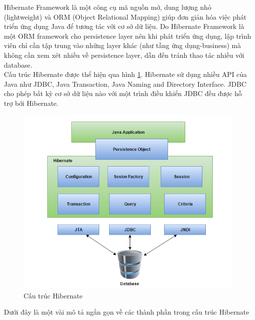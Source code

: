 \documentclass[12pt,a4paper,oneside]{extbook}
\begin{document}
Hibernate Framework là một công cụ mã nguồn mở, dung lượng nhỏ (lightweight) và ORM (Object Relational Mapping) giúp đơn giản hóa việc phát triển ứng dụng Java để tương tác với cơ sở dữ liệu. Do Hibernate Framework là một ORM framework cho persistence layer nên khi phát triển ứng dụng, lập trình viên chỉ cần tập trung vào những layer khác (như tầng ứng dụng-business) mà không cần xem xét nhiều về persistence layer, dẫn đến tránh thao tác nhiều với database.\\

\noindent
Cấu trúc Hibernate được thể hiện qua hình \ref{fig:3-hibernate-architecture}. Hibernate sử dụng nhiều API của Java như JDBC, Java Transaction, Java Naming and Directory Interface. JDBC cho  phép bất kỳ cơ sở dữ liệu nào với một trình điều khiển JDBC đều được hỗ trợ bởi Hibernate.

\begin{figure}[h]
  \centering
     \includegraphics[width=12cm]{3-hibernate-architecture}
  \caption{Cấu trúc Hibernate}\label{fig:3-hibernate-architecture}
\end{figure}

\noindent
Dưới đây là một vài mô tả ngắn gọn về các thành phần trong cấu trúc Hibernate
\end{document}
